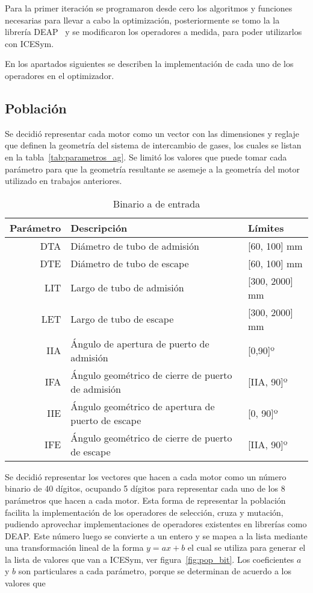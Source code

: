 Para la primer iteración se programaron desde cero los algoritmos y funciones
necesarias para llevar a cabo la optimización,  posteriormente se tomo la la
librería DEAP~\parencite{DEAP_JMLR2012} y se modificaron los operadores a medida,
para poder utilizarlos con ICESym.

En los apartados siguientes se describen la implementación de cada uno de los
operadores en el optimizador.

\subsection{Población}
%
Se decidió representar cada motor como un vector con las dimensiones y reglaje
que definen la geometría del sistema de intercambio de gases, los cuales se
listan en la tabla~\ref{tab:parametros_ag}.
%
Se limitó los valores que puede tomar cada parámetro para que la geometría
resultante se asemeje a la geometría del motor utilizado en trabajos anteriores.


\begin{table}
  \centering
  \begin{tabular}{rll} \toprule
    Parámetro & Descripción & Límites \\ \midrule
    DTA & Diámetro de tubo de admisión & [60, 100] mm \\
    DTE & Diámetro de tubo de escape & [60, 100] mm\\
    LIT & Largo de tubo de admisión & [300, 2000] mm\\
    LET & Largo de tubo de escape & [300, 2000] mm\\
    IIA & Ángulo de apertura de puerto de admisión & [0,90]º \\
    IFA & Ángulo geométrico de cierre de puerto de admisión & [IIA, 90]º \\
    IIE & Ángulo geométrico de apertura de puerto de escape & [0, 90]º \\
    IFE & Ángulo geométrico de cierre de puerto de escape & [IIA, 90]º \\ \bottomrule
  \end{tabular}
  \caption{Binario a de entrada}\label{tab:mapeo_pre}
\end{table}


Se decidió representar los vectores que hacen a cada motor como un número
binario de 40 dígitos, ocupando 5 dígitos para representar cada uno de los 8
parámetros que hacen a cada motor.
%
Esta forma de representar la población facilita la implementación de los
operadores de selección, cruza y mutación, pudiendo aprovechar implementaciones
de operadores existentes en librerías como DEAP.
%
Este número luego se convierte a un entero y se mapea a la lista mediante una
transformación lineal de la forma $y=ax+b$ el cual se utiliza para generar el
la lista de valores que van a ICESym, ver figura~\ref{fig:pop_bit}.
%
Los coeficientes $a$ y $b$ son particulares a cada parámetro, porque se
determinan de acuerdo a los valores que

